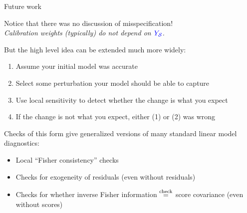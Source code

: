\begin{frame}{Future work}

Notice that there was no discussion of misspecification!\\[1em]

\emph{Calibration weights (typically) do not depend on $\textcolor{blue}{Y_{\mathcal{S}}}$.}

\pause

\vspace{2em}
But the high level idea can be extended much more widely:
%
\begin{enumerate}
\item Assume your initial model was accurate
\item Select some perturbation your model should be able to capture
\item Use local sensitivity to detect whether the change is what you expect
\item If the change is not what you expect, either (1) or (2) was wrong
\end{enumerate}
%

\pause

\vspace{2em}
Checks of this form give generalized versions of many standard linear model diagnostics:
%
\begin{itemize}
\item Local ``Fisher consistency'' checks
\item Checks for exogeneity of residuals (even without residuals)
\item Checks for whether inverse Fisher information $\overset{\textrm{check}}{=}$ score covariance (even without scores)
\end{itemize}
%
\end{frame}





